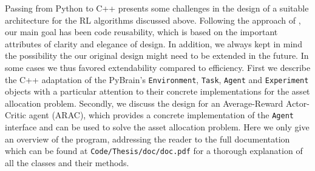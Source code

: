 Passing from Python to C++ presents some challenges in the design of a suitable architecture for the RL algorithms discussed above. Following the approach of \cite{joshi2008c++}, our main goal has been code reusability, which is based on the important attributes of clarity and elegance of design. In addition, we always kept in mind the possibility the our original design might need to be extended in the future. In some cases we thus favored extendability compared to efficiency. First we describe the C++ adaptation of the PyBrain's \lstinline{Environment}, \lstinline{Task}, \lstinline{Agent} and \lstinline{Experiment} objects with a particular attention to their concrete implementations for the asset allocation problem. Secondly, we discuss the design for an Average-Reward Actor-Critic agent (ARAC), which provides a concrete implementation of the \lstinline{Agent} interface and can be used to solve the asset allocation problem. Here we only give an overview of the program, addressing the reader to the full documentation which can be found at \lstinline{Code/Thesis/doc/doc.pdf} for a thorough explanation of all the classes and their methods. 

